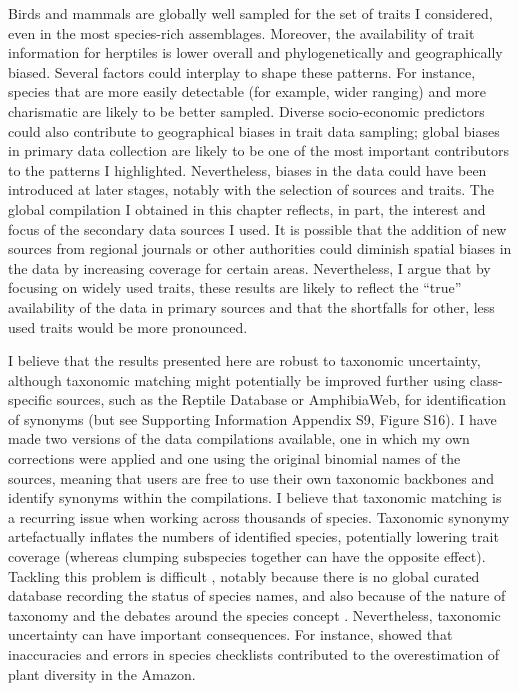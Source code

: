 Birds and mammals are globally well sampled for the set of traits I considered, even in the most species-rich assemblages. Moreover, the availability of trait information for herptiles is lower overall and phylogenetically and geographically biased. Several factors could interplay to shape these patterns. For instance, species that are more easily detectable (for example, wider ranging) and more charismatic are likely to be better sampled. Diverse socio-economic predictors could also contribute to geographical biases in trait data sampling; global biases in primary data collection are likely to be one of the most important contributors to the patterns I highlighted. Nevertheless, biases in the data could have been introduced at later stages, notably with the selection of sources and traits. The global compilation I obtained in this chapter reflects, in part, the interest and focus of the secondary data sources I used. It is possible that the addition of new sources from regional journals or other authorities could diminish spatial biases in the data by increasing coverage for certain areas. Nevertheless, I argue that by focusing on widely used traits, these results are likely to reflect the “true” availability of the data in primary sources and that the shortfalls for other, less used traits would be more pronounced.

I believe that the results presented here are robust to taxonomic uncertainty, although taxonomic matching might potentially be improved further using class-specific sources, such as the Reptile Database or AmphibiaWeb, for identification of synonyms (but see Supporting Information Appendix S9, Figure S16). I have made two versions of the data compilations available, one in which my own corrections were applied and one using the original binomial names of the sources, meaning that users are free to use their own taxonomic backbones and identify synonyms within the compilations.
I believe that taxonomic matching is a recurring issue when working across thousands of species. Taxonomic synonymy artefactually inflates the numbers of identified species, potentially lowering trait coverage (whereas clumping subspecies together can have the opposite effect). Tackling this problem is difficult \citep{Isaac2004, Jones2012}, notably because there is no global curated database recording the status of species names, and also because of the nature of taxonomy and the debates around the species concept \citep{May2011}. Nevertheless, taxonomic uncertainty can have important consequences. For instance, \citet{Cardoso2017} showed that inaccuracies and errors in species checklists contributed to the overestimation of plant diversity in the Amazon.

